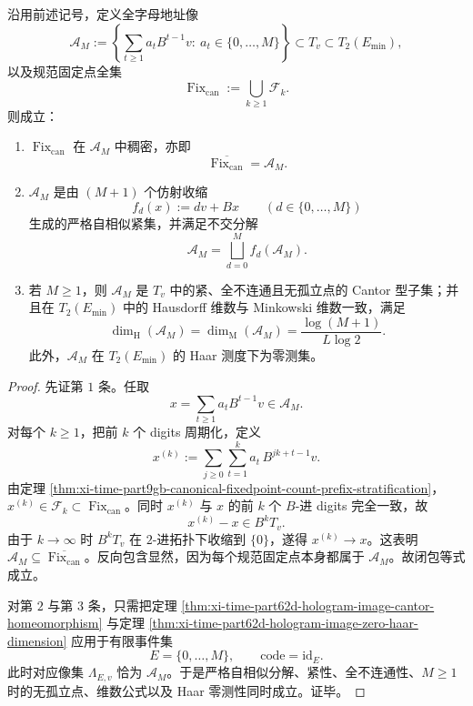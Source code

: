 \begin{theorem}\label{thm:xi-time-part9gb-full-alphabet-address-cantor-dimension}
沿用前述记号，定义全字母地址像
\[
\mathcal A_M
:=
\left\{
\sum_{t\ge 1}a_tB^{t-1}v:\ a_t\in\{0,\dots,M\}
\right\}
\subset T_v\subset T_2(E_{\min}),
\]
以及规范固定点全集
\[
\operatorname{Fix}_{\mathrm{can}}
:=
\bigcup_{k\ge 1}\mathcal F_k.
\]
则成立：
\begin{enumerate}
  \item \(\operatorname{Fix}_{\mathrm{can}}\) 在 \(\mathcal A_M\) 中稠密，亦即
  \[
  \overline{\operatorname{Fix}_{\mathrm{can}}}=\mathcal A_M.
  \]
  \item \(\mathcal A_M\) 是由 \((M+1)\) 个仿射收缩
  \[
  f_d(x):=dv+Bx
  \qquad (d\in\{0,\dots,M\})
  \]
  生成的严格自相似紧集，并满足不交分解
  \[
  \mathcal A_M=\bigsqcup_{d=0}^{M}f_d(\mathcal A_M).
  \]
  \item 若 \(M\ge 1\)，则 \(\mathcal A_M\) 是 \(T_v\) 中的紧、全不连通且无孤立点的 Cantor 型子集；并且在 \(T_2(E_{\min})\) 中的 Hausdorff 维数与 Minkowski 维数一致，满足
  \[
  \dim_{\mathrm H}(\mathcal A_M)
  =
  \dim_{\mathrm M}(\mathcal A_M)
  =
  \frac{\log(M+1)}{L\log 2}.
  \]
  此外，\(\mathcal A_M\) 在 \(T_2(E_{\min})\) 的 Haar 测度下为零测集。
\end{enumerate}
\end{theorem}
\begin{proof}
先证第 \(1\) 条。任取
\[
x=\sum_{t\ge 1}a_tB^{t-1}v\in \mathcal A_M.
\]
对每个 \(k\ge 1\)，把前 \(k\) 个 digits 周期化，定义
\[
x^{(k)}
:=
\sum_{j\ge 0}\sum_{t=1}^{k}a_t\,B^{jk+t-1}v.
\]
由定理 \ref{thm:xi-time-part9gb-canonical-fixedpoint-count-prefix-stratification}，\(x^{(k)}\in\mathcal F_k\subset \operatorname{Fix}_{\mathrm{can}}\)。同时 \(x^{(k)}\) 与 \(x\) 的前 \(k\) 个 \(B\)-进 digits 完全一致，故
\[
x^{(k)}-x\in B^kT_v.
\]
由于 \(k\to\infty\) 时 \(B^kT_v\) 在 \(2\)-进拓扑下收缩到 \(\{0\}\)，遂得 \(x^{(k)}\to x\)。这表明 \(\mathcal A_M\subseteq \overline{\operatorname{Fix}_{\mathrm{can}}}\)。反向包含显然，因为每个规范固定点本身都属于 \(\mathcal A_M\)。故闭包等式成立。

对第 \(2\) 与第 \(3\) 条，只需把定理 \ref{thm:xi-time-part62d-hologram-image-cantor-homeomorphism} 与定理 \ref{thm:xi-time-part62d-hologram-image-zero-haar-dimension} 应用于有限事件集
\[
E=\{0,\dots,M\},
\qquad
\mathrm{code}=\mathrm{id}_E.
\]
此时对应像集 \(\Lambda_{E,v}\) 恰为 \(\mathcal A_M\)。于是严格自相似分解、紧性、全不连通性、\(M\ge 1\) 时的无孤立点、维数公式以及 Haar 零测性同时成立。证毕。
\end{proof}

